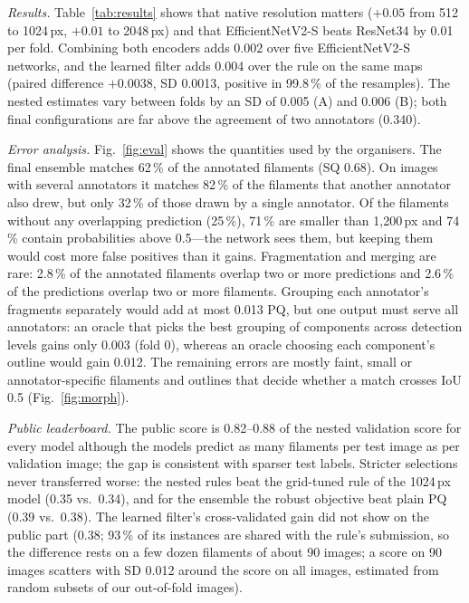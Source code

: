 \documentclass[sigconf]{acmart}
\begin{document}
\emph{Results.} Table~\ref{tab:results} shows that native resolution matters ($+0.05$ from 512 to 1024\,px, $+0.01$ to 2048\,px) and that EfficientNetV2-S beats ResNet34 by 0.01 per fold. Combining both encoders adds 0.002 over five EfficientNetV2-S networks, and the learned filter adds 0.004 over the rule on the same maps (paired difference $+0.0038$, SD 0.0013, positive in 99.8\,\% of the resamples). The nested estimates vary between folds by an SD of 0.005 (A) and 0.006 (B); both final configurations are far above the agreement of two annotators (0.340).

\emph{Error analysis.} Fig.~\ref{fig:eval} shows the quantities used by the organisers. The final ensemble matches 62\,\% of the annotated filaments (SQ 0.68). On images with several annotators it matches 82\,\% of the filaments that another annotator also drew, but only 32\,\% of those drawn by a single annotator. Of the filaments without any overlapping prediction (25\,\%), 71\,\% are smaller than 1,200\,px and 74\,\% contain probabilities above 0.5---the network sees them, but keeping them would cost more false positives than it gains. Fragmentation and merging are rare: 2.8\,\% of the annotated filaments overlap two or more predictions and 2.6\,\% of the predictions overlap two or more filaments. Grouping each annotator's fragments separately would add at most 0.013 PQ, but one output must serve all annotators: an oracle that picks the best grouping of components across detection levels gains only 0.003 (fold 0), whereas an oracle choosing each component's outline would gain 0.012. The remaining errors are mostly faint, small or annotator-specific filaments and outlines that decide whether a match crosses IoU 0.5 (Fig.~\ref{fig:morph}).

\emph{Public leaderboard.} The public score is 0.82--0.88 of the nested validation score for every model although the models predict as many filaments per test image as per validation image; the gap is consistent with sparser test labels. Stricter selections never transferred worse: the nested rules beat the grid-tuned rule of the 1024\,px model (0.35 vs.\ 0.34), and for the ensemble the robust objective beat plain PQ (0.39 vs.\ 0.38). The learned filter's cross-validated gain did not show on the public part (0.38; 93\,\% of its instances are shared with the rule's submission, so the difference rests on a few dozen filaments of about 90 images; a score on 90 images scatters with SD 0.012 around the score on all images, estimated from random subsets of our out-of-fold images).
\end{document}
